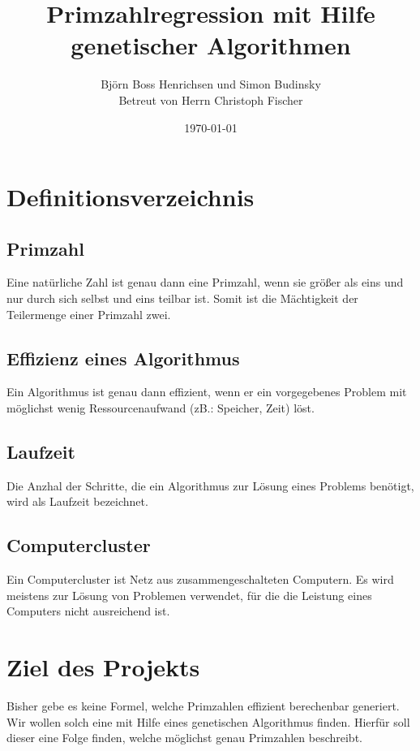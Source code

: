 \documentclass[a4paper,12pt]{article}
\begin{document}
\begin{titlepage}
\title{Primzahlregression mit Hilfe genetischer Algorithmen}
\author{Björn Boss Henrichsen und Simon Budinsky\\Betreut von Herrn Christoph Fischer}
\date{\today{}}
\maketitle{}
\newpage{}
\end{titlepage}

\tableofcontents{}
\newpage{}


\section{Definitionsverzeichnis}
\subsection{Primzahl}
Eine natürliche Zahl ist genau dann eine Primzahl, wenn sie größer als eins und nur durch sich selbst und eins teilbar ist. Somit ist die Mächtigkeit der Teilermenge einer Primzahl zwei.

\subsection{Effizienz eines Algorithmus}
Ein Algorithmus ist genau dann effizient, wenn er ein vorgegebenes Problem mit möglichst wenig Ressourcenaufwand (zB.: Speicher, Zeit) löst.

\subsection{Laufzeit}
Die Anzhal der Schritte, die ein Algorithmus zur Lösung eines Problems benötigt, wird als Laufzeit bezeichnet.

\subsection{Computercluster}
Ein Computercluster ist Netz aus zusammengeschalteten Computern. Es wird meistens zur Lösung von Problemen verwendet, für die die Leistung eines Computers nicht ausreichend ist.

\newpage{}


\section{Ziel des Projekts}
Bisher gebe es keine Formel, welche Primzahlen effizient berechenbar generiert. 
Wir wollen solch eine mit Hilfe eines genetischen Algorithmus finden. Hierfür soll dieser eine Folge finden, welche möglichst genau Primzahlen beschreibt.
\end{document}
